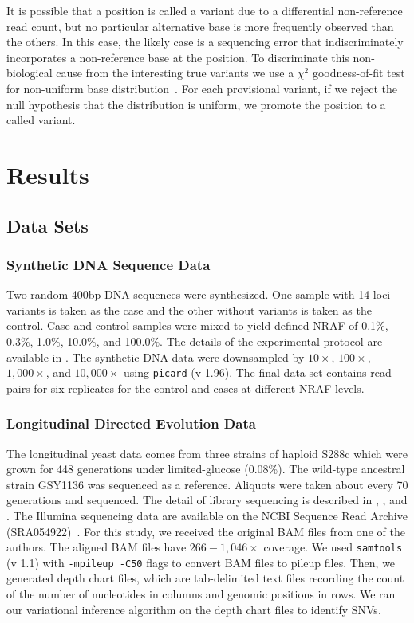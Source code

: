 \documentclass[11pt,reqno]{amsart}
\begin{document}
It is possible that a position is called a variant due to a differential non-reference read count, but no particular alternative base is more frequently observed than the others.
In this case, the likely case is a sequencing error that indiscriminately incorporates a non-reference base at the position.
To discriminate this non-biological cause from the interesting true variants we use a $\chi^2$ goodness-of-fit test for non-uniform base distribution~\citep{efron2010large, he2015rvd2}.
For each provisional variant, if we reject the null hypothesis that the distribution is uniform, we promote the position to a called variant.


\section{Results}

\subsection{Data Sets}

\subsubsection{Synthetic DNA Sequence Data}

Two random 400bp DNA sequences were synthesized. One sample with 14 loci variants is taken as the case and the other without variants is taken as the control.
Case and control samples were mixed to yield defined NRAF of 0.1\%, 0.3\%, 1.0\%, 10.0\%, and 100.0\%.
The details of the experimental protocol are available in \citet{flaherty2011ultrasensitive}.
The synthetic DNA data were downsampled by $10\times$, $100\times$, $1,000\times$, and $10,000\times$ using \texttt{picard} (v 1.96).
The final data set contains read pairs for six replicates for the control and cases at different NRAF levels.

\subsubsection{Longitudinal Directed Evolution Data}

The longitudinal yeast data comes from three strains of haploid S288c which were grown for 448 generations under limited-glucose (0.08\%).
The wild-type ancestral strain GSY1136 was sequenced as a reference.
Aliquots were taken about every 70 generations and sequenced.
The detail of library sequencing is described in \citet{kvitek2013whole}, \citet{bansal2010statistical}, and \citet{kao2008molecular}.
The Illumina sequencing data are available on the NCBI Sequence Read Archive (SRA054922)~\citep{kvitek2013whole}.
For this study, we received the original BAM files from one of the authors.
The aligned BAM files have $266-1,046\times$ coverage.
We used \texttt{samtools} (v 1.1) with \texttt{-mpileup -C50} flags to convert BAM files to pileup files.
Then, we generated depth chart files, which are tab-delimited text files recording the count of the number of nucleotides in columns and genomic positions in rows.
We ran our variational inference algorithm on the depth chart files to identify SNVs.
\end{document}
